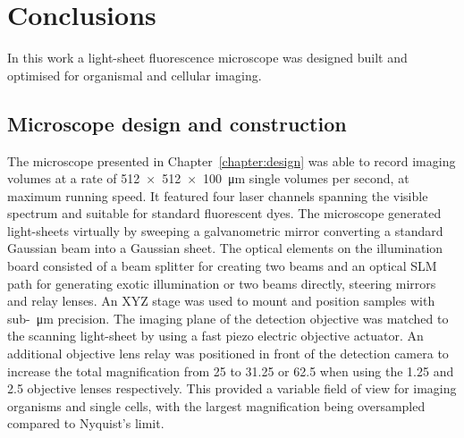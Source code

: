 \ifpdf{}
    \graphicspath{{Chapters/conclusions/Figs/Raster/}{Chapters/conclusions/Figs/PDF/}{Chapters/conclusions/Figs/}}
\else
    \graphicspath{{Chapters/conclusions/Figs/Vector/}{Chapters/conclusions/Figs/}}
\fi

\chapter{Conclusions}\label{chapter:conclusions} %

In this work a \gls{light-sheet} fluorescence microscope was designed built and optimised for organismal and cellular imaging.

\section{Microscope design and construction}

The microscope presented in Chapter~\ref{chapter:design} was able to record imaging volumes at a rate of \SI{512x512x100}{\micro\meter} single volumes per second, at maximum running speed.
It featured four laser channels spanning the visible spectrum and suitable for standard fluorescent dyes.
The microscope generated light-sheets virtually by sweeping a galvanometric mirror converting a standard Gaussian beam into a Gaussian sheet.
The optical elements on the \gls{illumination board} consisted of a beam splitter for creating two beams and an optical \gls{SLM} path for generating exotic illumination or two beams directly, steering mirrors and relay lenses.
An XYZ stage was used to mount and position samples with sub-\SI{}{\micro\meter} precision.
The imaging plane of the  detection objective was matched to the scanning light-sheet by using a fast piezo electric objective actuator.
An additional objective lens relay was positioned in front of the detection camera to increase the total magnification from \SI{25}{\times} to \SI{31.25}{\times} or \SI{62.5}{\times} when using the \SI{1.25}{\times} and \SI{2.5}{\times} objective lenses respectively.
This provided a variable field of view for imaging organisms and single cells, with the largest magnification being oversampled compared to Nyquist's limit.

